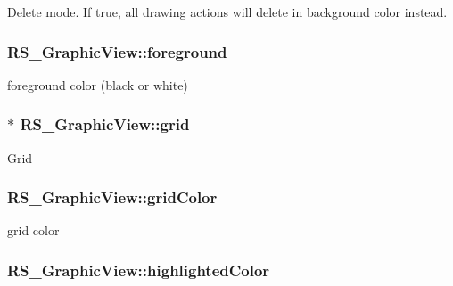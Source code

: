 Delete mode. If true, all drawing actions will delete in background color instead. \hypertarget{classRS__GraphicView_a9fdb72ef87525be0a3f1fe665d6025d8}{
\subsubsection[{foreground}]{ R\-S\-\_\-\-Graphic\-View\-::foreground\hspace{0.3cm}{\ttfamily [protected]}}}\label{classRS__GraphicView_a9fdb72ef87525be0a3f1fe665d6025d8}
foreground color (black or white) \hypertarget{classRS__GraphicView_a6396487e060f415b8447c81d73c4e3c1}{
\subsubsection[{grid}]{$\ast$ R\-S\-\_\-\-Graphic\-View\-::grid\hspace{0.3cm}{\ttfamily [protected]}}}\label{classRS__GraphicView_a6396487e060f415b8447c81d73c4e3c1}
Grid \hypertarget{classRS__GraphicView_af566f6066c667e51e37112e13cedc3b2}{
\subsubsection[{grid\-Color}]{ R\-S\-\_\-\-Graphic\-View\-::grid\-Color\hspace{0.3cm}{\ttfamily [protected]}}}\label{classRS__GraphicView_af566f6066c667e51e37112e13cedc3b2}
grid color \hypertarget{classRS__GraphicView_adf461ce844a72d1b839d5925775d5c99}{
\subsubsection[{highlighted\-Color}]{ R\-S\-\_\-\-Graphic\-View\-::highlighted\-Color\hspace{0.3cm}{\ttfamily [protected]}}}\label{classRS__GraphicView_adf461ce844a72d1b839d5925775d5c99}
